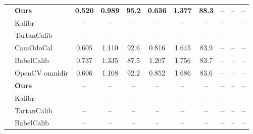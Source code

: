 \begin{table}[t]
\begin{tabular*}{\textwidth}{@{\extracolsep{\fill}}clccccccccc@{}}
& \textbf{Ours}       & \textbf{0.520} & \textbf{0.989} & \textbf{95.2} & \textbf{0.636} & \textbf{1.377} & \textbf{88.3} & -- & -- & -- \\
& Kalibr              & -- & -- & -- & -- & -- & -- & -- & -- & -- \\
& TartanCalib         & -- & -- & -- & -- & -- & -- & -- & -- & -- \\
& CamOdoCal           & 0.605 & 1.110 & 92.6 & 0.816 & 1.645 & 83.9 & -- & -- & -- \\
& BabelCalib          & 0.737 & 1.335 & 87.5 & 1.207 & 1.756 & 83.7 & -- & -- & -- \\
& OpenCV omnidir      & 0.606 & 1.108 & 92.2 & 0.852 & 1.686 & 83.6 & -- & -- & -- \\
\addlinespace[2pt]

& \textbf{Ours}       & -- & -- & -- & -- & -- & -- & -- & -- & -- \\
& Kalibr              & -- & -- & -- & -- & -- & -- & -- & -- & -- \\
& TartanCalib         & -- & -- & -- & -- & -- & -- & -- & -- & -- \\
& BabelCalib          & -- & -- & -- & -- & -- & -- & -- & -- & -- \\
\bottomrule
\end{tabular*}
\end{table}
